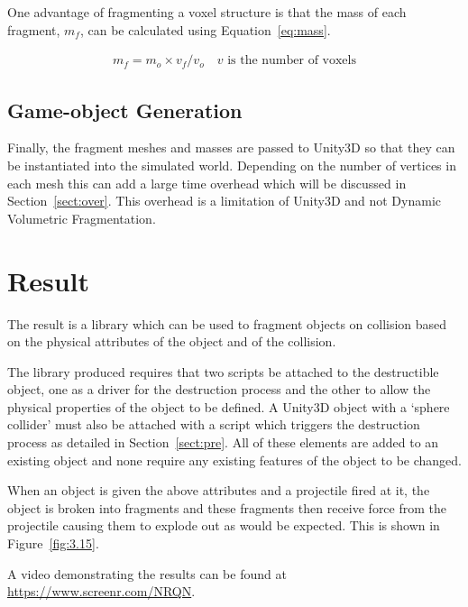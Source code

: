\label{sect:postphysics}

One advantage of fragmenting a voxel structure is that the mass of each fragment, $m_f$, can be calculated using Equation~\ref{eq:mass}.

\begin{equation}
\begin{split}
m_f=m_o\times v_f/v_o \quad \text{$v$ is the number of voxels}
\label{eq:mass}
\end{split}
\end{equation}

\subsection{Game-object Generation}

Finally, the fragment meshes and masses are passed to Unity3D so that they can be instantiated into the simulated world. Depending on the number of vertices in each mesh this can add a large time overhead which will be discussed in Section~\ref{sect:over}. This overhead is a limitation of Unity3D and not Dynamic Volumetric Fragmentation.

\section{Result}

\label{sect:result}

The result is a library which can be used to fragment objects on collision based on the physical attributes of the object and of the collision.

The library produced requires that two scripts be attached to the destructible object, one as a driver for the destruction process and the other to allow the physical properties of the object to be defined. A Unity3D object with a `sphere collider' must also be attached with a script which triggers the destruction process as detailed in Section~\ref{sect:pre}. All of these elements are added to an existing object and none require any existing features of the object to be changed.

When an object is given the above attributes and a projectile fired at it, the object is broken into fragments and these fragments then receive force from the projectile causing them to explode out as would be expected. This is shown in Figure~\ref{fig:3.15}.

A video demonstrating the results can be found at \url{https://www.screenr.com/NRQN}.

